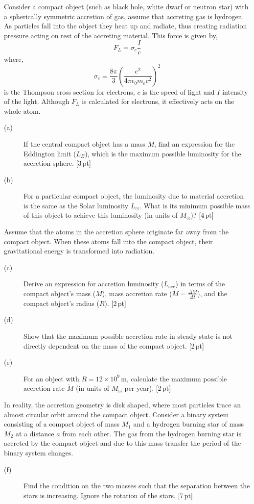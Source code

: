Consider a compact object (such as black hole, white dwarf or neutron star)
with a spherically symmetric accretion of gas, assume that accreting gas is
hydrogen. As particles fall into the object they heat up and radiate, thus
creating radiation pressure acting on rest of the accreting material. This
force is given by,
\[ F_L = \sigma_e \frac{I}{c} \]
where,
\[ \sigma_e = \frac{8\pi}{3}
   \left(\frac{e^2}{4\pi\epsilon_0 m_e c^2}\right)^2 \]
is the Thompson cross section for electrons, $c$ is the speed of light and $I$
intensity of the light. Although $F_L$ is calculated for electrons, it
effectively acts on the whole atom.

\begin{description}
\item[(a)] If the central compact object has a mass $M$, find an expression
  for the Eddington limit ($L_E$), which is the maximum possible luminosity
  for the accretion sphere. \hfill[3\,pt]
\item[(b)] For a particular compact object, the luminosity due to material
  accretion is the same as the Solar luminosity $L_\odot$. What is its minimum
  possible mass of this object to achieve this luminosity (in units of
  $M_\odot$)? \hfill[4\,pt]
\end{description}

Assume that the atoms in the accretion sphere originate far away from the
compact object. When these atoms fall into the compact object, their
gravitational energy is transformed into radiation.

\begin{description}
\item[(c)] Derive an expression for accretion luminosity ($L_{\mathrm{acc}}$)
  in terms of the compact object's mass ($M$), mass accretion rate
  ($\dot{M} = \frac{\Delta M}{\Delta t}$), and the compact object's radius
  ($R$). \hfill[2\,pt]
\item[(d)] Show that the maximum possible accretion rate in steady state is
  not directly dependent on the mass of the compact object. \hfill[2\,pt]
\item[(e)] For an object with $R = 12 \times 10^9$\,m, calculate the maximum
  possible accretion rate $\dot{M}$ (in units of $M_\odot$ per year).
  \hfill[2\,pt]
\end{description}

In reality, the accretion geometry is disk shaped, where most particles trace
an almost circular orbit around the compact object. Consider a binary system
consisting of a compact object of mass $M_1$ and a hydrogen burning star of
mass $M_2$ at a distance $a$ from each other. The gas from the hydrogen
burning star is accreted by the compact object and due to this mass transfer
the period of the binary system changes.

\begin{description}
\item[(f)] Find the condition on the two masses such that the separation
  between the stars is increasing. Ignore the rotation of the stars.
  \hfill[7\,pt]
\end{description}
